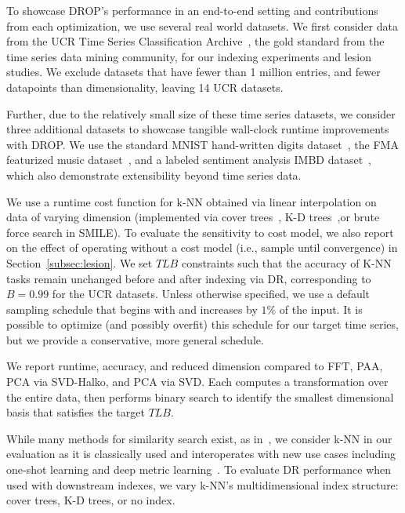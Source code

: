 To showcase DROP's performance in an end-to-end setting and contributions from each optimization, we use several real world datasets.
We first consider data from the UCR Time Series Classification Archive~\cite{ucr}, the gold standard from the time series data mining community, for our  indexing experiments and lesion studies. 
We exclude datasets that have fewer than 1 million entries, and fewer datapoints than dimensionality, leaving 14 UCR datasets. 

Further, due to the relatively small size of these time series datasets, we consider three additional datasets to showcase tangible wall-clock runtime improvements with DROP.
We use the standard MNIST hand-written digits dataset~\cite{mnist}, the FMA featurized music dataset~\cite{fma}, and a labeled sentiment analysis IMBD dataset~\cite{imdb}, which also demonstrate extensibility beyond time series data. 

 We use a runtime cost function for k-NN obtained via linear interpolation on data of varying dimension (implemented via cover trees~\cite{ctree}, K-D trees~\cite{kdtree},or brute force search in SMILE).
To evaluate the sensitivity to cost model, we also report on the effect of operating without a cost model (i.e., sample until convergence) in Section~\ref{subsec:lesion}.
We set $TLB$ constraints such that the accuracy of K-NN tasks remain unchanged before and after indexing via DR, corresponding to $B = 0.99$  for the UCR datasets.
Unless otherwise specified, we use a default sampling schedule that begins with and increases by $1\%$ of the input.
It is possible to optimize (and possibly overfit) this schedule for our target time series, but we provide a conservative, more general schedule.

 We report runtime, accuracy, and reduced dimension compared to FFT, PAA, PCA via SVD-Halko, and PCA via SVD. 
Each computes a transformation over the entire data, then performs binary search to identify the smallest dimensional basis that satisfies the target $TLB$. 

While many methods for similarity search exist, as in~\cite{keogh-study}, we consider k-NN in our evaluation as it is classically used and  interoperates with new use cases including one-shot learning and deep metric learning~\cite{knn1, knn2, knn3}.
To evaluate DR performance when used with downstream indexes, we vary k-NN's multidimensional index structure: cover trees, K-D trees, or no index. 

